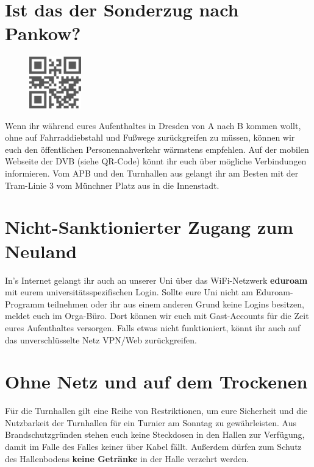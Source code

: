 \section*{Ist das der Sonderzug nach Pankow?}

\begin{figure}
  \vspace{-12pt}
  \begin{centering}
    \includegraphics[width=0.2\textwidth,keepaspectratio]{img/dvb_mobil.png}
  \end{centering}
  \vspace{-15pt}
\end{figure}

Wenn ihr während eures Aufenthaltes in Dresden von A nach B kommen wollt, ohne auf Fahrraddiebstahl und Fußwege zurückgreifen zu müssen, können wir euch den öffentlichen Personennahverkehr wärmstens empfehlen.
Auf der mobilen Webseite der DVB (siehe QR-Code) könnt ihr euch über mögliche Verbindungen informieren.
Vom APB und den Turnhallen aus gelangt ihr am Besten mit der Tram-Linie 3 vom Münchner Platz aus in die Innenstadt.

\section*{Nicht-Sanktionierter Zugang zum Neuland}

In's Internet gelangt ihr auch an unserer Uni über das WiFi-Netzwerk \textbf{eduroam} mit eurem universitätsspezifischen Login.
Sollte eure Uni nicht am Eduroam-Programm teilnehmen oder ihr aus einem anderen Grund keine Logins besitzen, meldet euch im Orga-Büro.
Dort können wir euch mit Gast-Accounts für die Zeit eures Aufenthaltes versorgen.
Falls etwas nicht funktioniert, könnt ihr auch auf das unverschlüsselte Netz VPN/Web zurückgreifen.

\section*{Ohne Netz und auf dem Trockenen}

Für die Turnhallen gilt eine Reihe von Restriktionen, um eure Sicherheit und die Nutzbarkeit der Turnhallen für ein Turnier am Sonntag zu gewährleisten.
Aus Brandschutzgründen stehen euch keine Steckdosen in den Hallen zur Verfügung, damit im Falle des Falles keiner über Kabel fällt.
Außerdem dürfen zum Schutz des Hallenbodens \textbf{keine Getränke} in der Halle verzehrt werden.

